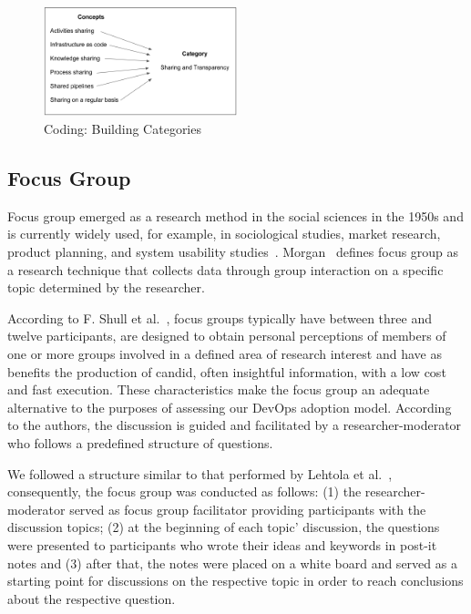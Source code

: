 \begin{figure}
  \centering
  \includegraphics[width=0.5\textwidth]{fig1.png}
  \caption{Coding: Building Categories}
  \label{fig1}
\end{figure}


\subsection{Focus Group}\label{sec:fg}

Focus group emerged as a research method in the social sciences in the 1950s
and is currently widely used, for example, in sociological studies, market
research, product planning, and system usability studies~\cite{shull2007guide}.
Morgan~\cite{morgan1996focus} defines focus group as a research technique that
collects data through group interaction on a specific topic determined by the
researcher.

According to F. Shull et al.~\cite{shull2007guide}, focus groups typically have
between three and twelve participants, are designed to obtain personal
perceptions of members of one or more groups involved in a defined area of
research interest and have as benefits the production of candid, often
insightful information, with a low cost and fast execution. These
characteristics make the focus group an adequate alternative to the purposes
of assessing our DevOps adoption model. According to the authors, the discussion is guided and
facilitated by a researcher-moderator who follows a predefined structure of
questions.

We followed a structure similar to that performed by Lehtola et al.~\cite{requirementes_priorization_in_practice},
consequently, the focus group was conducted as follows: (1) the researcher-moderator served as
focus group facilitator providing participants with the discussion topics;
(2) at the beginning of each topic' discussion, the
questions were presented to participants who wrote their ideas and keywords in
post-it notes and (3) after that, the notes were placed on a white board and served
as a starting point for discussions on the respective topic in order to reach
conclusions about the respective question.
